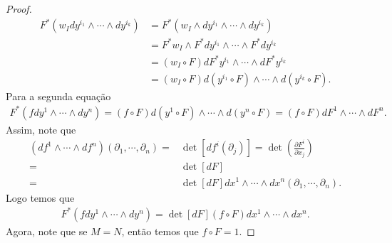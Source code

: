 \begin{proof} 
  \begin{align*}
    F^{\ast}(w_Idy^{i_1}\wedge\cdots\wedge dy^{i_k})&=F^{\ast}(w_I\wedge dy^{i_1}\wedge\cdots\wedge dy^{i_k})\\
    &=F^{\ast}w_I\wedge F^{\ast}dy^{i_1}\wedge\cdots\wedge F^{\ast}dy^{i_k}\\
    &=(w_I\circ F)dF^{\ast}y^{i_1}\wedge\cdots\wedge dF^{\ast}y^{i_k}\\
    &=(w_I\circ F)d(y^{i_1}\circ F)\wedge\cdots\wedge d(y^{i_k}\circ F).
  \end{align*}
  Para a segunda equação
  \begin{align*}
    F^{\ast}(fdy^1\wedge\cdots\wedge dy^{n})=(f\circ F)d(y^{1}\circ F)\wedge\cdots\wedge d(y^{n}\circ F)=(f\circ F)dF^{1}\wedge\cdots\wedge dF^{n}.
  \end{align*}
  Assim, note que
  \begin{align*}
    (df^{1}\wedge\cdots\wedge df^{n})(\partial_1,\cdots,\partial_{n})=&\det\left[ df^{i}(\partial_j) \right]=\det\left( \frac{\partial F^{i}}{\partial x_j} \right)\\
    =&\det\left[ dF \right]\\
    =&\det\left[ dF \right]dx^{1}\wedge\cdots\wedge dx^{n}(\partial_1,\cdots,\partial_n).
  \end{align*}
  Logo temos que
  \begin{align*}
    F^{\ast}(fdy^{1}\wedge\cdots\wedge dy^{n})=\det\left[ dF \right](f\circ F)dx^{1}\wedge\cdots\wedge dx^{n}.
  \end{align*}
  Agora, note que se $M=N$, então temos que $f\circ F=1$.
\end{proof}
